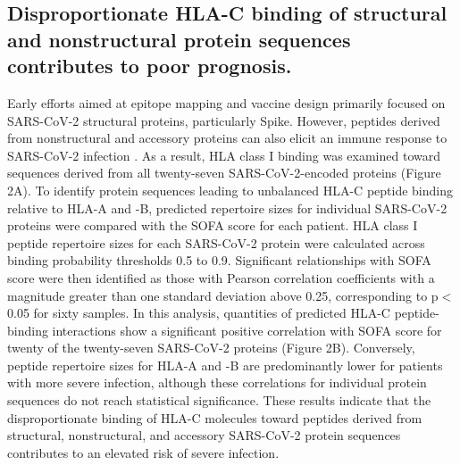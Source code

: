 \documentclass[utf8]{frontiersinFPHY_FAMS} %
\begin{document}
\subsection*{Disproportionate HLA-C binding of structural and nonstructural protein sequences contributes to poor prognosis.} Early efforts aimed at epitope mapping and vaccine design primarily focused on SARS-CoV-2 structural proteins, particularly Spike. However, peptides derived from nonstructural and accessory proteins can also elicit an immune response to SARS-CoV-2 infection \citep{32473127, 32887977}. As a result, HLA class I binding was examined toward sequences derived from all twenty-seven SARS-CoV-2-encoded proteins (Figure 2A). To identify protein sequences leading to unbalanced HLA-C peptide binding relative to HLA-A and -B, predicted repertoire sizes for individual SARS-CoV-2 proteins were compared with the SOFA score for each patient. HLA class I peptide repertoire sizes for each SARS-CoV-2 protein were calculated across binding probability thresholds 0.5 to 0.9. Significant relationships with SOFA score were then identified as those with Pearson correlation coefficients with a magnitude greater than one standard deviation above 0.25, corresponding to p$<$0.05 for sixty samples.  In this analysis, quantities of predicted HLA-C peptide-binding interactions show a significant positive correlation with SOFA score for twenty of the twenty-seven SARS-CoV-2 proteins (Figure 2B). Conversely, peptide repertoire sizes for HLA-A and -B are predominantly lower for patients with more severe infection, although these correlations for individual protein sequences do not reach statistical significance. These results indicate that the disproportionate binding of HLA-C molecules toward peptides derived from structural, nonstructural, and accessory SARS-CoV-2 protein sequences contributes to an elevated risk of severe infection.
\end{document}
